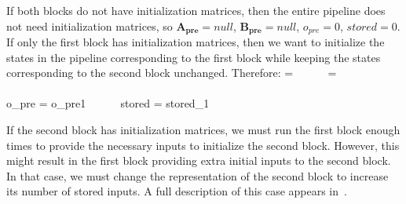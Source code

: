If both blocks do not have initialization matrices, then the entire
pipeline does not need initialization matrices, so $\mathbf{A_{pre}} =
null$, $\mathbf{B_{pre}} = null$, $o_{pre} = 0$, $stored = 0$. If only
the first block has initialization matrices, then we want to
initialize the states in the pipeline corresponding to the first block
while keeping the states corresponding to the second block
unchanged. Therefore:
\starteqnstar
{} =  ~~~~~
 = 
\doneeqnstar ~ \\ \vspace{-36pt} ~ \\
\starteqnstar
o_{pre} = o_{pre1} ~~~~~
stored = stored_1
\doneeqnstar

If the second block has initialization matrices, we must run the first
block enough times to provide the necessary inputs to initialize the
second block. However, this might result in the first block providing
extra initial inputs to the second block. In that case, we must change
the representation of the second block to increase its number of
stored inputs.  A full description of this case appears
in~\cite{Agrawal04}.


